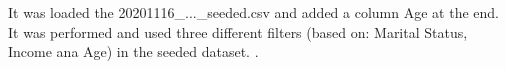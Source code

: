 It was loaded the 20201116_..._seeded.csv and added a column Age at the end.
It was performed and used three different filters (based on: Marital Status, Income ana Age) in the seeded dataset. .